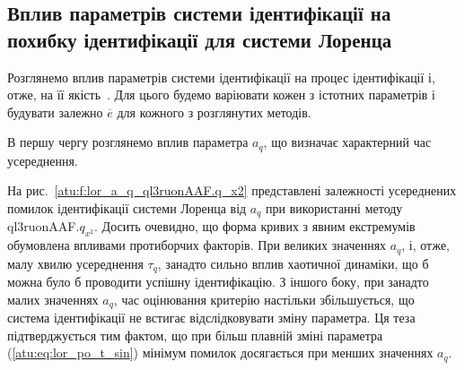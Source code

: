 \subsection{Вплив параметрів системи ідентифікації на похибку ідентифікації для системи Лоренца} %

Розглянемо вплив параметрів системи ідентифікації на процес
ідентифікації і, отже, на її якість~\cite{atu_ISDMCI2014}. Для цього будемо
варіювати кожен з істотних параметрів і будувати залежно
$ \overline{e} $ для кожного з розглянутих методів.

В першу чергу розглянемо вплив параметра
$a_q$, що визначає характерний час усереднення.

На рис.~\ref{atu:f:lor_a_q_ql3ruonAAF.q_x2} представлені залежності усереднених
помилок ідентифікації системи Лоренца від
$ a_q $ при використанні методу
ql3ruonAAF.$q_{x^2}$.
Досить очевидно, що форма кривих з явним екстремумів обумовлена
впливами протиборчих факторів. При великих значеннях
$a_q$, і, отже, малу хвилю усереднення
$ \tau_q $, занадто сильно вплив хаотичної динаміки, що б можна було
б проводити успішну ідентифікацію. З іншого боку, при занадто
малих значеннях
$a_q$, час оцінювання критерію настільки збільшується, що система
ідентифікації не встигає відслідковувати зміну параметра. Ця
теза підтверджується тим фактом, що при більш плавній зміні
параметра (\ref{atu:eq:lor_po_t_sin}) мінімум помилок досягається при
менших значеннях
$a_q$.


